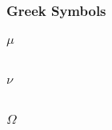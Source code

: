 \subsubsection{\textbf{Greek Symbols}}


\subsubsection{$ \mu $}

\begin{tabular}{l l l l}
\end{tabular}

\subsubsection{$ \nu $}

\begin{tabular}{l l l l}
\end{tabular}


\subsubsection{$ \Omega $}

\begin{tabular}{l l l l}
\end{tabular}